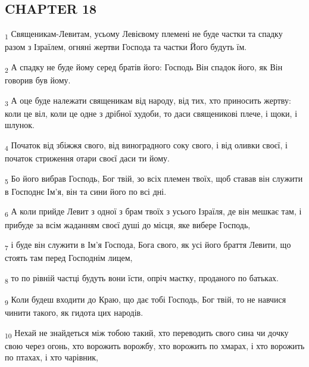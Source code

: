 \subsection{CHAPTER 18}
\begin{tcolorbox}
\textsubscript{1} Священикам-Левитам, усьому Левієвому племені не буде частки та спадку разом з Ізраїлем, огняні жертви Господа та частки Його будуть їм.
\end{tcolorbox}
\begin{tcolorbox}
\textsubscript{2} А спадку не буде йому серед братів його: Господь Він спадок його, як Він говорив був йому.
\end{tcolorbox}
\begin{tcolorbox}
\textsubscript{3} А оце буде належати священикам від народу, від тих, хто приносить жертву: коли це віл, коли це одне з дрібної худоби, то даси священикові плече, і щоки, і шлунок.
\end{tcolorbox}
\begin{tcolorbox}
\textsubscript{4} Початок від збіжжя свого, від виноградного соку свого, і від оливки своєї, і початок стриження отари своєї даси ти йому.
\end{tcolorbox}
\begin{tcolorbox}
\textsubscript{5} Бо його вибрав Господь, Бог твій, зо всіх племен твоїх, щоб ставав він служити в Господнє Ім'я, він та сини його по всі дні.
\end{tcolorbox}
\begin{tcolorbox}
\textsubscript{6} А коли прийде Левит з одної з брам твоїх з усього Ізраїля, де він мешкає там, і прибуде за всім жаданням своєї душі до місця, яке вибере Господь,
\end{tcolorbox}
\begin{tcolorbox}
\textsubscript{7} і буде він служити в Ім'я Господа, Бога свого, як усі його браття Левити, що стоять там перед Господнім лицем,
\end{tcolorbox}
\begin{tcolorbox}
\textsubscript{8} то по рівній частці будуть вони їсти, опріч маєтку, проданого по батьках.
\end{tcolorbox}
\begin{tcolorbox}
\textsubscript{9} Коли будеш входити до Краю, що дає тобі Господь, Бог твій, то не навчися чинити такого, як гидота цих народів.
\end{tcolorbox}
\begin{tcolorbox}
\textsubscript{10} Нехай не знайдеться між тобою такий, хто переводить свого сина чи дочку свою через огонь, хто ворожить ворожбу, хто ворожить по хмарах, і хто ворожить по птахах, і хто чарівник,
\end{tcolorbox}
